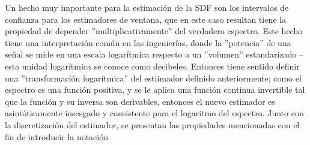 %

%
%
%



%

Un hecho muy importante para la estimaci\'on de la SDF son los intervalos de confianza para los
estimadores de ventana, que en este caso resultan tiene la propiedad de depender 
''multiplicativamente''
del verdadero espectro. Este hecho tiene una interpretaci\'on com\'un en las ingenier\'ias,
donde la ''potencia'' de una se\~nal se mide en una escala logar\'itmica respecto a un ''volumen''
estandarizado --esta unidad logar\'itmica se conoce como decibeles.
Entonces tiene sentido definir una ''transformaci\'on logar\'itmica'' del estiimador
definido anteriormente; como el espectro es una funci\'on positiva, y se le aplica una funci\'on
continua invertible tal que la funci\'on y su inversa son derivables, entonces el nuevo estimador
es asint\'oticamente insesgado y consistente para el logaritmo del espectro.
Junto con la discretizaci\'on del estimador, se presentan las propiedades mencionadas con el fin
de introducir la notaci\'on

